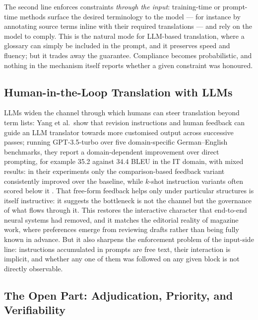 The second line enforces constraints \emph{through the input}:
training-time or prompt-time methods surface the desired terminology
to the model --- for instance by annotating source terms inline with
their required translations \cite{dinu2019terminology} --- and rely on
the model to comply. This is the natural mode for LLM-based
translation, where a glossary can simply be included in the prompt,
and it preserves speed and fluency; but it trades away the guarantee.
Compliance becomes probabilistic, and nothing in the mechanism itself
reports whether a given constraint was honoured.

\subsection{Human-in-the-Loop Translation with LLMs}

LLMs widen the channel through which humans can steer translation
beyond term lists: Yang et al.\ show that revision instructions and
human feedback can guide an LLM translator towards more customised
output across successive passes; running GPT-3.5-turbo over five
domain-specific German--English benchmarks, they report a
domain-dependent improvement over direct prompting, for example 35.2
against 34.4 BLEU in the IT domain, with mixed results: in their
experiments only the comparison-based feedback variant consistently
improved over the baseline, while $k$-shot instruction variants often
scored below it \cite{yang2023human}. That free-form feedback helps
only under particular structures is itself instructive: it suggests
the bottleneck is not the channel but the governance of what flows
through it.
This restores the interactive character that end-to-end neural systems
had removed, and it matches the editorial reality of magazine work,
where preferences emerge from reviewing drafts rather than being fully
known in advance. But it also sharpens the enforcement problem of the
input-side line: instructions accumulated in prompts are free text,
their interaction is implicit, and whether any one of them was
followed on any given block is not directly observable.

\subsection{The Open Part: Adjudication, Priority, and Verifiability}

